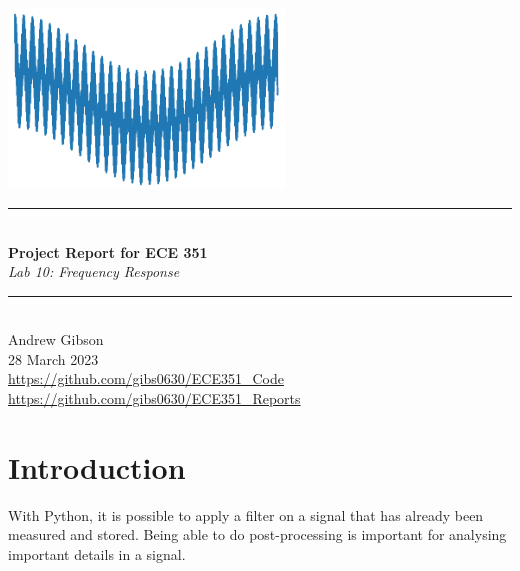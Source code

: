\documentclass[12pt,a4paper]{article}
\newcommand{\HRule}{\rule{\linewidth}{0.5mm}}
\begin{document}
\begin{titlepage}
\begin{center}
\includegraphics[width=0.55\textwidth]{titlepage_image.png}~\\[2cm]
\HRule \\[0.4cm]
{ \LARGE 
  \textbf{Project Report for ECE 351}\\[0.4cm]
  \emph{Lab 10: Frequency Response}\\[0.4cm]
}
\HRule \\[1.5cm]
{ \large
  Andrew Gibson \\[0.1cm]
 28 March 2023\\[0.1cm]
  \url{https://github.com/gibs0630/ECE351\_Code}\\[0.1cm]
  \url{https://github.com/gibs0630/ECE351\_Reports}\\[0.1cm]
}
\vfill
{\large }
 
\end{center}
\end{titlepage}
\newpage
\tableofcontents
{}
\newpage
\setcounter{page}{1}
\section{Introduction}\label{sec:intro}
With Python, it is possible to apply a filter on a signal that has already been measured and stored.  Being able to do post-processing is important for analysing important details in a signal.
\end{document}
